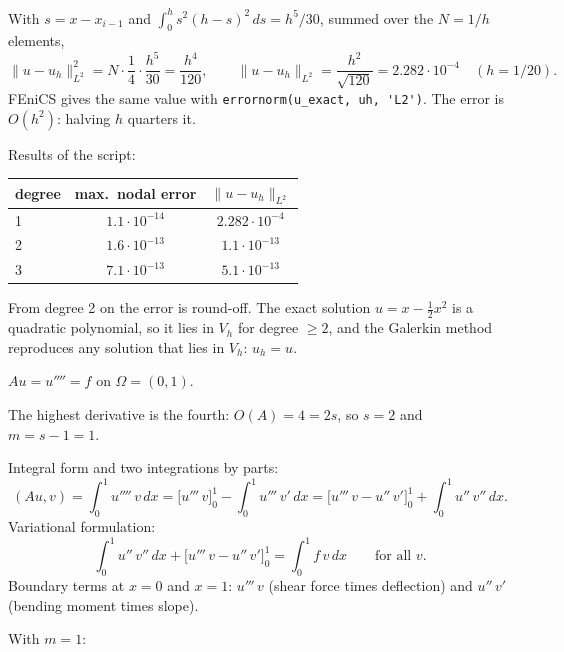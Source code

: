  With $s = x - x_{i-1}$ and $\int_0^h s^2 (h - s)^2 \, ds = h^5 / 30$, summed over the $N = 1/h$ elements,
\[
  \|u - u_h\|_{L^2}^2 = N \cdot \frac14 \cdot \frac{h^5}{30} = \frac{h^4}{120},
  \qquad \|u - u_h\|_{L^2} = \frac{h^2}{\sqrt{120}} = 2.282 \cdot 10^{-4} \quad (h = 1/20) .
\]
FEniCS gives the same value with \lstinline|errornorm(u_exact, uh, 'L2')|. The error is $O(h^2)$: halving $h$ quarters it.

 Results of the script:

\begin{center}
\begin{tabular}{lcc}
  \toprule
  degree & max.\ nodal error & $\|u - u_h\|_{L^2}$ \\
  \midrule
  1 & $1.1 \cdot 10^{-14}$ & $2.282 \cdot 10^{-4}$ \\
  2 & $1.6 \cdot 10^{-13}$ & $1.1 \cdot 10^{-13}$ \\
  3 & $7.1 \cdot 10^{-13}$ & $5.1 \cdot 10^{-13}$ \\
  \bottomrule
\end{tabular}
\end{center}

From degree 2 on the error is round-off. The exact solution $u = x - \tfrac12 x^2$ is a quadratic polynomial, so it
lies in $V_h$ for degree $\ge 2$, and the Galerkin method reproduces any solution that lies in $V_h$: $u_h = u$.




$A u = u'''' = f$ on $\Omega = (0, 1)$.

 The highest derivative is the fourth: $O(A) = 4 = 2s$, so $s = 2$ and $m = s - 1 = 1$.

 Integral form and two integrations by parts:
\[
  (Au, v) = \int_0^1 u''''\, v \, dx
  = \big[u'''\, v\big]_0^1 - \int_0^1 u'''\, v' \, dx
  = \big[u'''\, v - u''\, v'\big]_0^1 + \int_0^1 u''\, v'' \, dx .
\]
Variational formulation:
\[
  \int_0^1 u''\, v'' \, dx + \big[u'''\, v - u''\, v'\big]_0^1 = \int_0^1 f\, v \, dx \qquad \text{for all } v .
\]
Boundary terms at $x = 0$ and $x = 1$: $u'''\, v$ (shear force times deflection) and $u''\, v'$ (bending moment times
slope).

 With $m = 1$:

